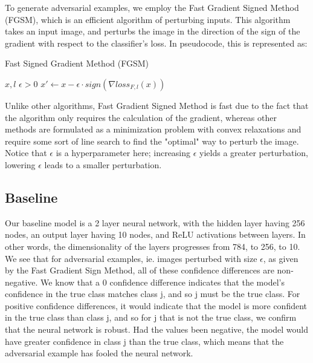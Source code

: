 \documentclass{article}
\begin{document}
To generate adversarial examples, we employ the Fast Gradient Signed Method (FGSM), which is an 
efficient algorithm of perturbing inputs. This algorithm takes an input image, and perturbs the
image in the direction of the sign of the gradient with respect to the classifier's loss. In 
pseudocode, this is represented as:

\begin{algorithm}
    \caption{Fast Signed Gradient Method (FGSM)}
\begin{algorithmic}
    \Require $x, l$
    \Require $\epsilon > 0$
    \State $x' \gets x - \epsilon \cdot sign(\nabla loss_{F, l}(x))$
\end{algorithmic}
\end{algorithm}

Unlike other algorithms, Fast Gradient Signed Method is fast due to the fact that the algorithm
only requires the calculation of the gradient, whereas other methods are formulated as a 
minimization problem with convex relaxations and require some sort of line search to find the
"optimal" way to perturb the image. Notice that $\epsilon$ is a hyperparameter here; increasing
$\epsilon$ yields a greater perturbation, lowering $\epsilon$ leads to a smaller perturbation.

\subsection{Baseline}

Our baseline model is a 2 layer neural network, with the hidden layer having 256 nodes, an output
layer having 10 nodes, and ReLU activations between layers. In other words, the dimensionality of 
the layers progresses from 784, to 256, to 10. We see that for adversarial examples, ie. images
perturbed with size $\epsilon$, as given by the Fast Gradient Sign Method, all of these confidence
differences are non-negative. We know that a 0 confidence difference indicates that the model's
confidence in the true class matches class j, and so j must be the true class. For positive
confidence differences, it would indicate that the model is more confident in the true class
than class j, and so for j that is not the true class, we confirm that the neural network is robust.
Had the values been negative, the model would have greater confidence in class j than the true
class, which means that the adversarial example has fooled the neural network. \\
\end{document}
